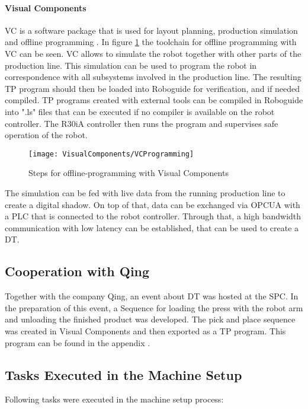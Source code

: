 \paragraph{Visual Components}
\ac{VC} is a software package that is used for layout planning, production simulation and offline programming%
. In figure \ref{fig:VCProgramming} the toolchain for offline programming with \ac{VC} can be seen.  \ac{VC} allows to simulate the robot together with other parts of the production line.  This simulation can be used to program the robot in correspondence with all subsystems involved in the production line. The resulting TP program should then be loaded into Roboguide for verification, and if needed compiled. TP programs created with external tools can be compiled in Roboguide into ".ls" files that can be executed if no compiler is available on the robot controller. The R30iA controller then runs the program and supervises safe operation of the robot.

\begin{figure}[H]
	\texttt{[image: VisualComponents/VCProgramming]}
	\caption{Steps for offline-programming with Visual Components}
	\label{fig:VCProgramming}
\end{figure}


The simulation can be fed with live data from the running production line to create a digital shadow. On top of that, data can be exchanged via \ac{OPCUA} with a \ac{PLC} that is connected to the robot controller. Through that, a high bandwidth communication with low latency can be established, that can be used to create a \ac{DT}.

\subsection{Cooperation with Qing}
Together with the company Qing, an event about \ac{DT} was hosted at the \ac{SPC}. In the preparation of this event, a Sequence for loading the press with the robot arm and unloading the finished product was developed. The  pick and place sequence was created in Visual Components and then exported as a TP program. This program can be found in the appendix .

\subsection{Tasks Executed in the Machine Setup}
Following tasks were executed in the machine setup process:

